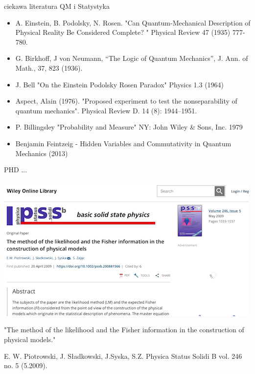 \documentclass{beamer}
\begin{document}
\begin{frame}{ciekawa literatura QM i Statystyka}
\begin{itemize}
\item A. Einstein, B. Podolsky, N. Rosen. "Can Quantum-Mechanical Description of Physical Reality Be Considered Complete? " Physical Review 47 (1935) 777-780.
\item G. Birkhoff, J von Neumann,  “The Logic of Quantum Mechanics”, J. Ann. of Math., 37, 823 (1936).
\item J. Bell "On the Einstein Podolsky Rosen Paradox" Physics 1.3 (1964) 
\item  Aspect, Alain (1976). "Proposed experiment to test the nonseparability of quantum mechanics". Physical Review D. 14 (8): 1944–1951.
\item P. Billingsley "Probability and Measure" NY: John Wiley \& Sons, Inc. 1979
\item Benjamin Feintzeig - Hidden Variables and Commutativity in Quantum Mechanics (2013)
\end{itemize}
\end{frame}


\begin{frame}{PHD ...}
\begin{center}
\includegraphics[scale=0.5]{pub4}

"The method of the likelihood and the Fisher information in the construction of physical models." 

{ \tiny E. W. Piotrowski, J. Sładkowski, J.Syska, S.Z. Physica Status Solidi B vol. 246 no. 5 (5.2009).}
\end{center}
\end{frame}
\end{document}
